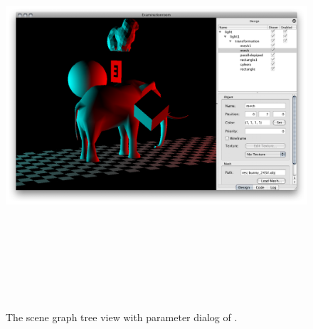 \begin{figure}
\begin{center}
\includegraphics[height=15cm]{screenshots/er_tree_screenshot.png}
\caption{The scene graph tree view with parameter dialog of \ER.\label{ssTree}}
\end{center}
\end{figure}

